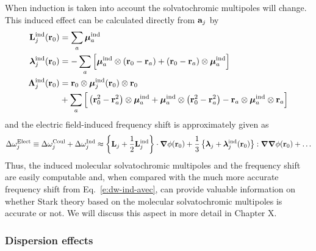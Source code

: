 \documentclass[a4paper,titlepage,twoside,fleqn,12pt]{book}
\newcommand{\BM}[1]{\bm{#1}}
\begin{document}
\begin{refsection}
When induction is taken into account the solvatochromic multipoles
will change. This induced effect can be calculated directly from
${\bf a}_j$ by
%
\begin{subequations}
\begin{align}
{\bf L}_j^{\rm ind}({\bf r}_0)       &=   \sum_a {\BM \mu}_a^{\rm ind} \label{e:34e1} \\
{\BM \lambda}_j^{\rm ind}({\bf r}_0) &= - \sum_a \Big[ {\BM \mu}_a^{\rm ind} \otimes \left( {\bf r}_0 
                                       - {\bf r}_a \right) + \left( {\bf r}_0 
                                       - {\bf r}_a \right) \otimes {\BM \mu}_a^{\rm ind} \Big] \label{e:34e2} \\
{\BM \Lambda}_j^{\rm ind}({\bf r}_0) &=   {\bf r}_0 \otimes {\BM \mu}_j^{\rm ind}({\bf r}_0) \otimes {\bf r}_0 \nonumber \\ 
                                    &  + \sum_a \Big[ \left( {\bf r}_0^2 - {\bf r}_a^2 \right) \otimes {\BM \mu}_a^{\rm ind} 
                                       + {\BM \mu}_a^{\rm ind} \otimes \left( {\bf r}_0^2 - {\bf r}_a^2 \right) 
                                       - {\bf r}_a \otimes {\BM \mu}_a^{\rm ind} \otimes {\bf r}_a \Big] \label{e:34e3}
\end{align}
\end{subequations}
%
and the electric field\hyp{}induced frequency shift 
is approximately given as
%
\begin{equation} \label{e:dmtp-solmmm-ind}
 \Delta\omega_j^{\rm Elect} \equiv  \Delta\omega_j^{\rm Coul} +  \Delta\omega_j^{\rm Ind} \approx  
                       \left\{ {\bf L}_j + \frac{1}{2} {\bf L}_j^{\rm ind} \right\} 
                       \cdot {\BM \nabla} \phi({\bf r}_0)   + 
      \frac{1}{3} \left\{ {\BM \lambda}_j + {\BM \lambda}_j^{\rm ind}({\bf r}_0) \right\} 
                           : {\BM \nabla}  {\BM \nabla} \phi({\bf r}_0)   +   \ldots
\end{equation}
%
Thus, the induced molecular solvatochromic multipoles and the frequency shift
are easily computable and, when compared with the much more accurate
frequency shift from Eq.~\eqref{e:dw-ind-avec}, can provide valuable 
information on whether Stark theory based on the molecular
solvatochromic multipoles is accurate or not. We will discuss 
this aspect in more detail in Chapter X.

\subsubsection{Dispersion effects\label{s:disp}}


\end{refsection}
\end{document}
